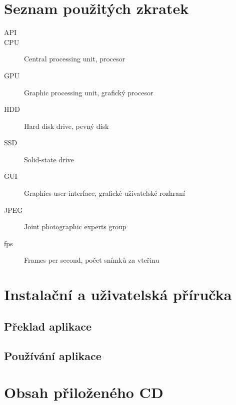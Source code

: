 \documentclass[11pt,twoside,a4paper]{book}
\begin{document}
\renewcommand\refname{Zdroje}

\def\CS{$\cal C\kern-0.1667em\lower.5ex\hbox{$\cal S$}\kern-0.075em $}



\appendix


\chapter{Seznam použitých zkratek}

\begin{description}
\item[API]
\item[CPU] Central processing unit, procesor
\item[GPU] Graphic processing unit, grafický procesor
\item[HDD] Hard disk drive, pevný disk
\item[SSD] Solid-state drive
\item[GUI] Graphics user interface, grafické uživatelské rozhraní
\item[JPEG]  Joint photographic experts group
\item[fps]  Frames per second, počet snímků za vteřinu
\end{description}

\chapter{Instalační a uživatelská příručka}
\label{chap:install}

\section{Překlad aplikace}
\section{Používání aplikace}

\chapter{Obsah přiloženého CD}
\end{document}
